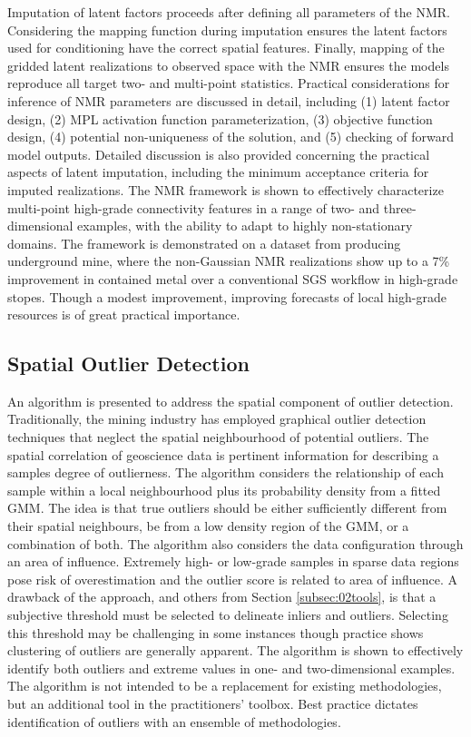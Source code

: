 Imputation of latent factors proceeds after defining all parameters of the \gls{NMR}. Considering the mapping function during imputation ensures the latent factors used for conditioning have the correct spatial features. Finally, mapping of the gridded latent realizations to observed space with the \gls{NMR} ensures the models reproduce all target two- and multi-point statistics. Practical considerations for inference of \gls{NMR} parameters are discussed in detail, including (1) latent factor design, (2) \gls{MPL} activation function parameterization, (3) objective function design, (4) potential non-uniqueness of the solution, and (5) checking of forward model outputs. Detailed discussion is also provided concerning the practical aspects of latent imputation, including the minimum acceptance criteria for imputed realizations. The \gls{NMR} framework is shown to effectively characterize multi-point high-grade connectivity features in a range of two- and three-dimensional examples, with the ability to adapt to highly non-stationary domains. The framework is demonstrated on a dataset from producing underground mine, where the non-Gaussian \gls{NMR} realizations show up to a 7\% improvement in contained metal over a conventional \gls{SGS} workflow in high-grade stopes. Though a modest improvement, improving forecasts of local high-grade resources is of great practical importance.

\subsection{Spatial Outlier Detection}
\label{subsec:07outlier}

An algorithm is presented to address the spatial component of outlier detection. Traditionally, the mining industry has employed graphical outlier detection techniques that neglect the spatial neighbourhood of potential outliers. The spatial correlation of geoscience data is pertinent information for describing a samples degree of outlierness. The algorithm considers the relationship of each sample within a local neighbourhood plus its probability density from a fitted \gls{GMM}. The idea is that true outliers should be either sufficiently different from their spatial neighbours, be from a low density region of the \gls{GMM}, or a combination of both. The algorithm also considers the data configuration through an area of influence. Extremely high- or low-grade samples in sparse data regions pose risk of overestimation and the outlier score is related to area of influence. A drawback of the approach, and others from Section \ref{subsec:02tools}, is that a subjective threshold must be selected to delineate inliers and outliers. Selecting this threshold may be challenging in some instances though practice shows clustering of outliers are generally apparent. The algorithm is shown to effectively identify both outliers and extreme values in one- and two-dimensional examples. The algorithm is not intended to be a replacement for existing methodologies, but an additional tool in the practitioners' toolbox. Best practice dictates identification of outliers with an ensemble of methodologies.

